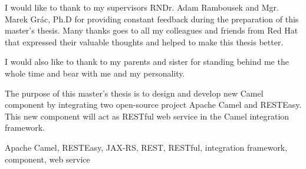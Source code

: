 \documentclass[12pt,final,oneside]{fithesis2}
\begin{document}
\FrontMatter
\ThesisTitlePage

\begin{ThesisDeclaration}
  \DeclarationText
  \AdvisorName
\end{ThesisDeclaration}

\begin{ThesisThanks}
I would like to thank to my supervisors RNDr. Adam Rambousek and Mgr. Marek Grác, Ph.D
for providing constant feedback during the preparation of this master’s
thesis. Many thanks goes to all my colleagues and friends from Red Hat that
expressed their valuable thoughts and helped to make this thesis better.

I would also like to thank to my parents and sister for standing behind me the whole time and bear with me and my personality.
\end{ThesisThanks}

\begin{ThesisAbstract}
The purpose of this master’s thesis is to design and develop new Camel
component by integrating two open-source project Apache Camel and
RESTEasy. This new component will act as RESTful web service in
the Camel integration framework.
\end{ThesisAbstract}

\begin{ThesisKeyWords}
Apache Camel, RESTEasy, JAX-RS, REST, RESTful, integration framework, component, web service

\end{ThesisKeyWords}

\MainMatter

\tableofcontents

\end{document}

